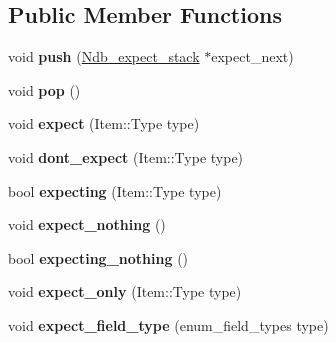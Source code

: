 \subsection*{Public Member Functions}
\begin{DoxyCompactItemize}
\item 
\mbox{\label{classNdb__expect__stack_aa46d6d0071b3af8afbff43129b0bf40d}} 
void {\bfseries push} (\mbox{\hyperlink{classNdb__expect__stack}{Ndb\+\_\+expect\+\_\+stack}} $\ast$expect\+\_\+next)
\item 
\mbox{\label{classNdb__expect__stack_afd88289e4c885b8a1da64e2df8416403}} 
void {\bfseries pop} ()
\item 
\mbox{\label{classNdb__expect__stack_a11f4cda6b72f1af589a6acdc911843a7}} 
void {\bfseries expect} (Item\+::\+Type type)
\item 
\mbox{\label{classNdb__expect__stack_a35ca6b7103e70d4ec4bde407e15d24a5}} 
void {\bfseries dont\+\_\+expect} (Item\+::\+Type type)
\item 
\mbox{\label{classNdb__expect__stack_a1cc81e1cdf6ff0f22512ad5d3cd19127}} 
bool {\bfseries expecting} (Item\+::\+Type type)
\item 
\mbox{\label{classNdb__expect__stack_afd90226aa9985983bf4e0414d3c74fde}} 
void {\bfseries expect\+\_\+nothing} ()
\item 
\mbox{\label{classNdb__expect__stack_ac83f29e993f577a40350a33086838f9f}} 
bool {\bfseries expecting\+\_\+nothing} ()
\item 
\mbox{\label{classNdb__expect__stack_a20efbc1ff7694a1a3b21f305ffff77ee}} 
void {\bfseries expect\+\_\+only} (Item\+::\+Type type)
\item 
\mbox{\label{classNdb__expect__stack_a4be47776f004155114724be49bdf3707}} 
void {\bfseries expect\+\_\+field\+\_\+type} (enum\+\_\+field\+\_\+types type)
\item 
\mbox{\label{classNdb__expect__stack_aa9b68c52f0dc68ec092eb45d20f276eb}} 

\end{DoxyCompactItemize}
